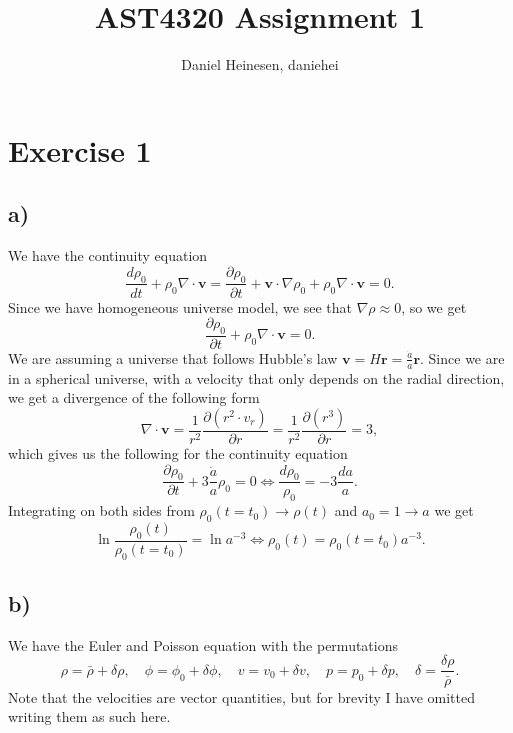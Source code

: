 \documentclass[a4paper,norsk, 10pt]{article}
\title{AST4320 Assignment 1}
\author{Daniel Heinesen, daniehei}
\begin{document}
\maketitle

\section{Exercise 1}
\subsection{a)}
We have the continuity equation
\begin{equation}
\frac{d\rho_0}{dt} + \rho_0 \nabla \cdot \mathbf{v} = \frac{\partial\rho_0}{\partial t} + \mathbf{v}\cdot \nabla \rho_0 + \rho_0 \nabla \cdot \mathbf{v} = 0.
\end{equation}
Since we have homogeneous universe model, we see that $\nabla \rho \approx 0$, so we get
\begin{equation}
\frac{\partial\rho_0}{\partial t} + \rho_0 \nabla \cdot \mathbf{v} = 0.
\end{equation}
We are assuming a universe that follows Hubble's law $\mathbf{v} = H\mathbf{r} = \frac{\dot{a}}{a}\mathbf{r}$. Since we are in a spherical universe, with a velocity that only depends on the radial direction, we get a divergence of the following form
\begin{equation}
\nabla \cdot \mathbf{v} = \frac{1}{r^2}\frac{\partial (r^2 \cdot v_r)}{\partial r} = \frac{1}{r^2}\frac{\partial (r^3)}{\partial r} = 3,
\end{equation}
which gives us the following for the continuity equation
\begin{equation}
\frac{\partial\rho_0}{\partial t} + 3\frac{\dot{a}}{a}\rho_0 = 0 \Leftrightarrow \frac{d\rho_0}{\rho_0} = -3 \frac{da}{a}.
\end{equation}
Integrating on both sides from $\rho_0(t=t_0) \rightarrow \rho(t)$ and $a_0 = 1 \rightarrow a$ we get
\begin{equation}
\ln \frac{\rho_0(t)}{\rho_0(t=t_0)} = \ln a^{-3} \Leftrightarrow \rho_0(t) = \rho_0(t=t_0)a^{-3}.
\end{equation}
\subsection{b)}
We have the Euler and Poisson equation with the permutations
\begin{equation}
\rho = \bar{\rho} + \delta \rho, \quad \phi = \phi_0 + \delta \phi, \quad v = v_0 + \delta v, \quad p = p_0 + \delta p, \quad \delta = \frac{\delta \rho}{\bar{\rho}}.
\end{equation}
Note that the velocities are vector quantities, but for brevity I have omitted writing them as such here.
\end{document}
